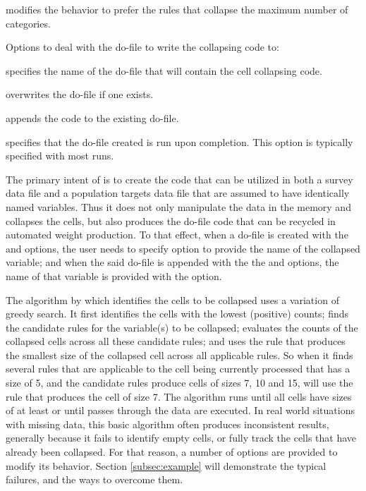\hangpara
{} modifies the behavior  to prefer the rules
that collapse the maximum number of categories.

Options to deal with the do-file to write the collapsing code to:	

\hangpara
{} specifies the name of the do-file that will contain the cell collapsing code.

\hangpara
{} overwrites the do-file if one exists.

\hangpara
{} appends the code to the existing do-file.

\hangpara
{} specifies that the do-file created is run upon completion. This option is typically specified with most runs.

The primary intent of  is to create the code that can be
utilized in both a survey data file and a population targets data file that
are assumed to have identically named variables. Thus it does not only manipulate the data in the memory
and collapses the cells, but also produces the do-file code that can be recycled in automated
weight production.
To that effect, when a do-file is created with the  and  options,
the user needs to specify  option to provide the name of the collapsed variable;
and when the said do-file is appended with the the  and  options,
the name of that variable is provided with the  option.

The algorithm by which  identifies the cells to be collapsed uses
a variation of greedy search.
It first identifies the cells with the lowest (positive) counts; finds the candidate rules
for the variable(s) to be collapsed; evaluates the counts of the collapsed cells across all
these candidate rules; and uses the rule that produces the smallest size of the
collapsed cell across all applicable rules. So when it finds several rules that are applicable
to the cell being currently processed that has a size of 5, and the candidate rules produce cells
of sizes 7, 10 and 15,  will use the rule that produces the cell
of size 7. The algorithm runs until all cells have sizes of at least
 or until  passes through the data are executed.
In real world situations with missing data, this basic algorithm often produces inconsistent 
results, generally because it fails to identify empty cells, or fully track the cells 
that have already been collapsed.
For that reason, a number of options are provided to modify its behavior.
Section \ref{subsec:example} will demonstrate the typical failures, and the ways to overcome them.

